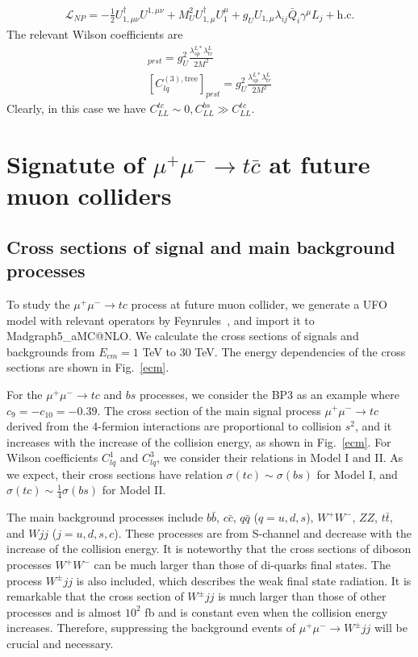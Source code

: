 \documentclass[a4paper,11pt]{article}
\makeatletter
\newcommand{\mgamc}{Madgraph5\_aMC@NLO}
\makeatother
\begin{document}
\begin{enumerate}
\begin{align}
        \mathcal{L}_{NP}=-\frac{1}{2}U_{1,\mu\nu}^{\dag}U^{1,\mu\nu}+M_U^2U_{1,\mu}^{\dag}U_1^{\mu}+g_UU_{1,\mu}\lambda_{ij}\bar{Q}_{i}\gamma^{\mu}L_{j}+\textrm{h.c.}
        \end{align}
        The relevant Wilson coefficients are
        \begin{align}
            [C_{lq}^{(1),\textrm{tree}}]_{prst}=g_U^2\frac{\lambda_{sp}^{L*}\lambda_{tr}^{L}}{2M^2}\\
            [C_{lq}^{(3),\textrm{tree}}]_{prst}=g_U^2\frac{\lambda_{sp}^{L*}\lambda_{tr}^{L}}{2M^2}
        \end{align}
        Clearly, in this case we have $C_{LL}^{tc}\sim0,C_{LL}^{bs}\gg C_{LL}^{tc}$.
\end{enumerate}

\section{Signatute of $\mu^+\mu^-\to t\bar{c}$ at future muon colliders }
\label{Sec:result}

\subsection{Cross sections of signal and main background processes}
To study the $\mu^+\mu^-\to tc$ process at future muon collider, 
we generate a UFO model with relevant operators by Feynrules~\cite{Alloul:2013bka}, 
and import it to \mgamc \cite{Alwall:2014hca}. 
We calculate the cross sections of signals and backgrounds from $E_{cm}=1$ TeV to $30$ TeV.  
The energy dependencies of the cross sections are shown in Fig.~\ref{ecm}. 

For the $\mu^+\mu^-\to tc$ and $bs$ processes, we consider the BP3 as an example where $c_{9}=-c_{10}=-0.39$. The cross section of the main signal process $\mu^+ \mu^- \to tc$ derived from the 4-fermion interactions are proportional to collision $s^2$, 
and it increases with the increase of the collision energy, as shown in Fig.~\ref{ecm}. 
For Wilson coefficients $C^{1}_{lq}$ and $C^{3}_{lq}$, we consider their relations in Model I and II. 
As we expect, their cross sections have relation $\sigma(tc)\sim \sigma(bs)$ for Model I, and $\sigma(tc)\sim\frac{1}{4}\sigma(bs)$ for Model II. 

The main background processes include $b\bar{b}$, $c\bar{c}$, $q\bar{q}$ ($q=u,d,s$), $W^+ W^-$, $ZZ$, $t \bar{t}$, and $Wjj$ ($j=u,d,s,c$). 
These processes are from S-channel and decrease with the increase of the collision energy. 
It is noteworthy that the cross sections of diboson processes $W^+W^-$ can be much larger than those of di-quarks final states. 
The process $W^\pm jj$ is also included, which describes the weak final state radiation. 
It is remarkable that the cross section of $W^\pm jj$ is much larger than those of other processes and is almost $10^2$ fb and is constant even when the collision energy increases. 
Therefore, suppressing the background events of $\mu^+ \mu^- \to W^\pm jj$ will be crucial and necessary.
\end{document}

